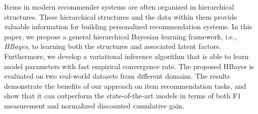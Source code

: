 Items in modern recommender systems are often organized in hierarchical structures. These hierarchical structures and the data within them provide valuable information for building personalized recommendation systems. In this paper, we propose a general hierarchical Bayesian learning framework, i.e., \emph{HBayes}, to learning both the structures and associated latent factors. Furthermore, we develop a variational inference algorithm that is able to learn model parameters with fast empirical convergence rate. The proposed HBayes is evaluated on two real-world datasets from different domains. The results demonstrate the benefits of our approach on  item recommendation tasks, and show that it can outperform the state-of-the-art models in terms of both F1 measurement and normalized discounted cumulative gain.
